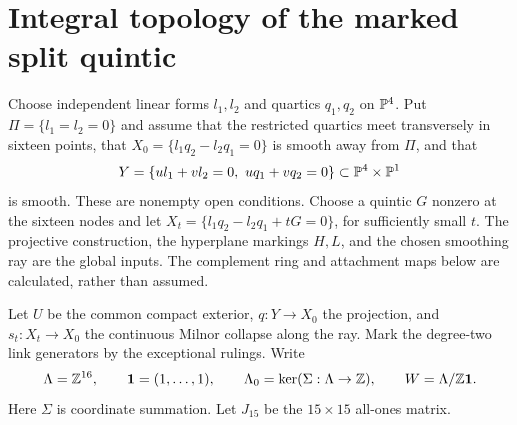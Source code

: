 \section{Integral topology of the marked split quintic}\label{sec:integral-topology}
Choose independent linear forms $l_1,l_2$ and quartics $q_1,q_2$ on
$\mathbb P^4$. Put $\Pi=\{l_1=l_2=0\}$ and assume that the restricted
quartics meet transversely in sixteen points, that
$X_0=\{l_1q_2-l_2q_1=0\}$ is smooth away from $\Pi$, and that
\[
 Y=\{ul_1+vl_2=0,\ uq_1+vq_2=0\}
       \subset\mathbb P^4\times\mathbb P^1
\]
is smooth. These are nonempty open conditions. Choose a quintic $G$
nonzero at the sixteen nodes and let
$X_t=\{l_1q_2-l_2q_1+tG=0\}$, for sufficiently small $t$.
The projective construction, the hyperplane markings $H,L$, and the
chosen smoothing ray are the global inputs. The complement ring and
attachment maps below are calculated, rather than assumed.

Let $U$ be the common compact exterior, $q:Y\to X_0$ the projection,
and $s_t:X_t\to X_0$ the continuous Milnor collapse along the ray.
Mark the degree-two link generators by the exceptional rulings.
Write
\[
 \Lambda=\mathbb Z^{16},\qquad \mathbf1=(1,\ldots,1),\qquad
 \Lambda_0=\ker(\Sigma:\Lambda\to\mathbb Z),\qquad W=\Lambda/\mathbb Z\mathbf1.
\]
Here $\Sigma$ is coordinate summation. Let $J_{15}$ be the
$15\times15$ all-ones matrix.

